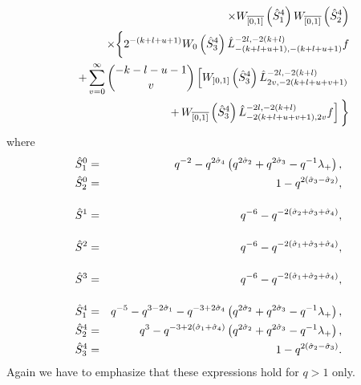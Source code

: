 \documentclass[a4paper,11pt,oneside]{article}
\begin{document}
\begin{eqnarray}
&&\hspace*{-.0cm}\times W_{\overline{\left[ 0,1\right] }}\left(\hat{S}^4_1
\right)  
 W_{\overline{\left[ 0,1\right] }}\left( 
\hat{S}^4_2 
\right)\nonumber\\ 
&&\hspace*{-0.cm}\times \bigg \{ 2^{-\left(
k+l+u+1\right) }  W_{0}\left(
\hat{S}^4_3
\right) \hat{L}^{-2l,-2(k+l)}_{-(k+l+u+1),-(k+l+u+1)} f
\nonumber \\
&&\hspace*{-.0cm}+\sum_{v=0}^{\infty }{-k-l-u-1 \choose v} 
 \left[ W_{\left] 0,1\right] }\left( 
\hat{S}^4_3
\right) \hat{L}^{-2l,-2(k+l)}_{2v,-2(k+l+u+v+1)}\right.
   \nonumber \\
&&\hspace*{-.0cm}\left.
+\,W_{\overline{\left[ 0,1\right]} }\left( 
\hat{S}^4_3  
\right) \hat{L}^{-2l,-2(k+l)}_{-2(k+l+u+v+1),2v}f
 \right] \bigg\}  \nonumber
\end{eqnarray}
where
\begin{eqnarray}
\hat{S}_1^0&=&q^{-2}-q^{2\hat{\sigma}_{4}}\left(
q^{2\hat{\sigma}_{2}}+q^{2\hat{\sigma}_{3}}-q^{-1}\lambda
_{+}\right),\\
\hat{S}_2^0&=& 1-q^{2\left( \hat{%
\sigma}_{3}-\hat{\sigma}_{2}\right) },
\nonumber\\[0.16in]
\hat{S}^1&=& 
q^{-6}-q^{-2\left( 
\hat{\sigma}_{2}+\hat{\sigma}_{3}+\hat{\sigma}_{4}\right) },\\[0.16in]
\hat{S}^2&=& q^{-6}-q^{-2\left( 
\hat{\sigma}_{1}+\hat{\sigma}_{3}+\hat{\sigma}_{4}\right) },\\[0.16in]
\hat{S}^3&=& q^{-6}-q^{-2\left( 
\hat{\sigma}_{1}+\hat{\sigma}_{2}+\hat{\sigma}_{4}\right) },\\[0.16in]
\hat{S}^4_1&=&q^{-5}-q^{3-2\hat{%
\sigma}_{1}}-q^{-3+2\hat{\sigma}_{4}}\left( q^{2\hat{\sigma}_{2}}+q^{2\hat{%
\sigma}_{3}}-q^{-1}\lambda _{+}\right),\\
\hat{S}_2^4&=& q^{3}-q^{-3+2\left(\hat{\sigma}_1+\hat{%
\sigma}_{4}\right)}\left( q^{2\hat{\sigma}_{2}}+
q^{2\hat{\sigma}_{3}}-q^{-1}\lambda_{+}\right),\nonumber\\
\hat{S}^4_3&=& 1-q^{2\left( \hat{%
\sigma}_{2}-\hat{\sigma}_{3}\right)}
\nonumber . 
\end{eqnarray}
Again we have to emphasize that these expressions hold for $q>1$ only.
\end{document}
